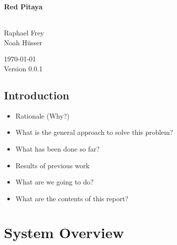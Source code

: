 \documentclass[a4paper,oneside]{alpenthesis/alpenthesis}
\begin{document}
\begin{titlingpage} %
    \flushright\sffamily

    \vspace*{5em}
    \Huge\bfseries{Red Pitaya}\\[1ex]
    \Large{}\\[3ex]

    \normalsize\mdseries
    
    \vfill
    Raphael Frey\\
    Noah H\"usser\\[3ex]

    \vspace{5em}

    \today\\
    Version 0.0.1
\end{titlingpage} %

\frontmatter %
\tableofcontents*
\clearpage
\listoffigures*
\clearpage
\listoftables*
\clearpage
\listoflistings
\clearpage

\mainmatter

\chapter{Introduction} %
\label{ch:intro}

\begin{itemize}\firmlist
    \item Rationale (Why?)
    \item What is the general approach to solve this problem?
    \item What has been done so far?
    \item Results of previous work
    \item What are we going to do?
    \item What are the contents of this report?
\end{itemize}

\cite{1163535}


\part{System Overview} %
\label{part:System_Overview}
\end{document}
